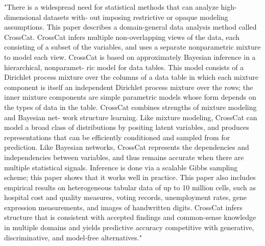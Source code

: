 "There is a widespread need for statistical methods that can analyze high-dimensional datasets with- out imposing restrictive or opaque modeling assumptions. This paper describes a domain-general data analysis method called CrossCat. CrossCat infers multiple non-overlapping views of the data, each consisting of a subset of the variables, and uses a separate nonparametric mixture to model each view. CrossCat is based on approximately Bayesian inference in a hierarchical, nonparamet- ric model for data tables. This model consists of a Dirichlet process mixture over the columns of a data table in which each mixture component is itself an independent Dirichlet process mixture over the rows; the inner mixture components are simple parametric models whose form depends on the types of data in the table. CrossCat combines strengths of mixture modeling and Bayesian net- work structure learning. Like mixture modeling, CrossCat can model a broad class of distributions by positing latent variables, and produces representations that can be efficiently conditioned and sampled from for prediction. Like Bayesian networks, CrossCat represents the dependencies and independencies between variables, and thus remains accurate when there are multiple statistical signals. Inference is done via a scalable Gibbs sampling scheme; this paper shows that it works well in practice. This paper also includes empirical results on heterogeneous tabular data of up to 10 million cells, such as hospital cost and quality measures, voting records, unemployment rates, gene expression measurements, and images of handwritten digits. CrossCat infers structure that is consistent with accepted findings and common-sense knowledge in multiple domains and yields predictive accuracy competitive with generative, discriminative, and model-free alternatives."

\cite{DBLP:journals/corr/MansinghkaSJPGT15}


